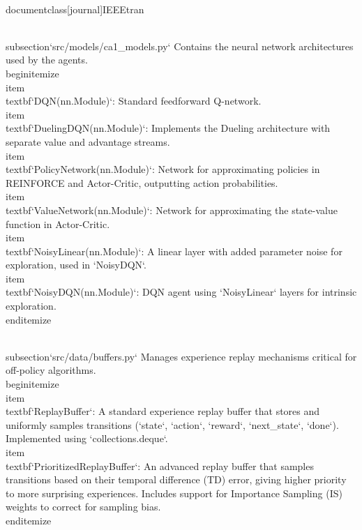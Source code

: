 \\documentclass[journal]{IEEEtran}
\begin{document}
\\subsection{`src/models/ca1_models.py`}
Contains the neural network architectures used by the agents.
\\begin{itemize}
    \\item \\textbf{`DQN(nn.Module)`}: Standard feedforward Q-network.
    \\item \\textbf{`DuelingDQN(nn.Module)`}: Implements the Dueling architecture with separate value and advantage streams.
    \\item \\textbf{`PolicyNetwork(nn.Module)`}: Network for approximating policies in REINFORCE and Actor-Critic, outputting action probabilities.
    \\item \\textbf{`ValueNetwork(nn.Module)`}: Network for approximating the state-value function in Actor-Critic.
    \\item \\textbf{`NoisyLinear(nn.Module)`}: A linear layer with added parameter noise for exploration, used in `NoisyDQN`.
    \\item \\textbf{`NoisyDQN(nn.Module)`}: DQN agent using `NoisyLinear` layers for intrinsic exploration.
\\end{itemize}

\\subsection{`src/data/buffers.py`}
Manages experience replay mechanisms critical for off-policy algorithms.
\\begin{itemize}
    \\item \\textbf{`ReplayBuffer`}: A standard experience replay buffer that stores and uniformly samples transitions (`state`, `action`, `reward`, `next_state`, `done`). Implemented using `collections.deque`.
    \\item \\textbf{`PrioritizedReplayBuffer`}: An advanced replay buffer that samples transitions based on their temporal difference (TD) error, giving higher priority to more surprising experiences. Includes support for Importance Sampling (IS) weights to correct for sampling bias.
\\end{itemize}
\end{document}
